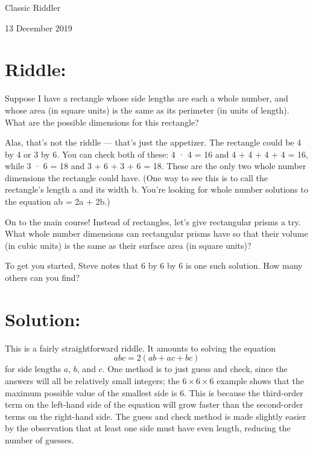 \documentclass{article}
\begin{document}
\pagestyle{empty} %


\begin{center}
{\LARGE Classic Riddler}

\vspace{0.2in}

{\Large 13 December 2019}
\end{center}


\section*{Riddle:}

Suppose I have a rectangle whose side lengths are each a whole number, and whose area (in square units) is the same as its perimeter (in units of length). What are the possible dimensions for this rectangle?

Alas, that’s not the riddle — that’s just the appetizer. The rectangle could be 4 by 4 or 3 by 6. You can check both of these: 4 · 4 = 16 and 4 + 4 + 4 + 4 = 16, while 3 · 6 = 18 and 3 + 6 + 3 + 6 = 18. These are the only two whole number dimensions the rectangle could have. (One way to see this is to call the rectangle’s length a and its width b. You’re looking for whole number solutions to the equation ab = 2a + 2b.)

On to the main course! Instead of rectangles, let’s give rectangular prisms a try. What whole number dimensions can rectangular prisms have so that their volume (in cubic units) is the same as their surface area (in square units)?

To get you started, Steve notes that 6 by 6 by 6 is one such solution. How many others can you find?


\section*{Solution:}

This is a fairly straightforward riddle.
It amounts to solving the equation
\begin{equation*}
abc=2(ab+ac+bc)
\end{equation*}
for side lengths $a$, $b$, and $c$.
One method is to just guess and check, since the answers will all be relatively small integers; the $6\times6\times6$ example shows that the maximum possible value of the smallest side is 6.
This is because the third-order term on the left-hand side of the equation will grow faster than the second-order terms on the right-hand side.
The guess and check method is made slightly easier by the observation that at least one side must have even length, reducing the number of guesses.
\end{document}
